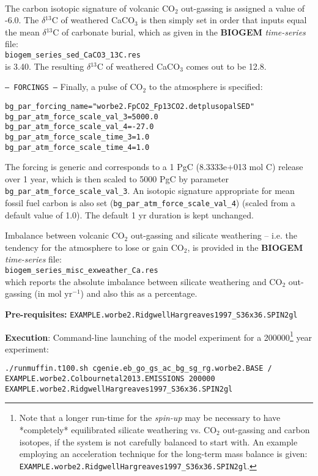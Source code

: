 \documentclass[10pt,twoside]{article}
\begin{document}
\begin{compactitem}
\\The carbon isotopic signature of volcanic CO$_{2}$ out-gassing is assigned a value of -6.0\permil. The $\delta$$^{13}$C of weathered CaCO$_{3}$ is then simply set in order that inputs equal the mean $\delta$$^{13}$C of carbonate burial, which as given in the \textbf{BIOGEM} \textit{time-series} file:
\\\texttt{biogem\_series\_sed\_CaCO3\_13C.res}
\\is 3.40\permil. The resulting $\delta$$^{13}$C of weathered CaCO$_{3}$ comes out to be 12.8\permil.
                \item \texttt{--- FORCINGS ---}
Finally, a pulse of CO$_{2}$ to the atmosphere is specified:
\vspace{-5pt}\begin{verbatim}
bg_par_forcing_name="worbe2.FpCO2_Fp13CO2.detplusopalSED"
bg_par_atm_force_scale_val_3=5000.0
bg_par_atm_force_scale_val_4=-27.0
bg_par_atm_force_scale_time_3=1.0
bg_par_atm_force_scale_time_4=1.0
                \end{verbatim}\vspace{-5pt}
The forcing is generic and corresponds to a 1 PgC (8.3333e+013 mol C) release over 1 year, which is then scaled to 5000 PgC by parameter \texttt{bg\_par\_atm\_force\_scale\_val\_3}. An isotopic signature appropriate for mean fossil fuel carbon is also set (\texttt{bg\_par\_atm\_force\_scale\_val\_4}) (scaled from a default value of 1.0). The default 1 yr duration is kept unchanged.
\end{compactitem}

\noindent Imbalance between volcanic CO$_{2}$ out-gassing and silicate weathering -- i.e. the tendency for the atmosphere to lose or gain CO$_{2}$, is provided in the \textbf{BIOGEM} \textit{time-series} file:
\\\texttt{biogem\_series\_misc\_exweather\_Ca.res}
\\which reports the absolute imbalance between silicate weathering and CO$_{2}$ out-gassing (in mol yr$^{-1}$) and also this as a percentage.

\noindent \textbf{Pre-requisites:} \texttt{EXAMPLE.worbe2.RidgwellHargreaves1997\_S36x36.SPIN2gl}

\noindent \textbf{Execution}: Command-line launching of the model experiment for a 200000\footnote{Note that a longer run-time for the \textit{spin-up} may be necessary to have *completely* equilibrated silicate weathering vs. CO$_{2}$ out-gassing and carbon isotopes, if the system is not carefully balanced to start with. An example employing an acceleration technique for the long-term mass balance is given: \\ \texttt{EXAMPLE.worbe2.RidgwellHargreaves1997\_S36x36.SPIN2gl}.} year experiment:
\vspace{-10pt}\small\begin{verbatim}
./runmuffin.t100.sh cgenie.eb_go_gs_ac_bg_sg_rg.worbe2.BASE / 
EXAMPLE.worbe2.Colbournetal2013.EMISSIONS 200000 
EXAMPLE.worbe2.RidgwellHargreaves1997_S36x36.SPIN2gl
\end{verbatim}\normalsize\vspace{-10pt}
\end{document}
